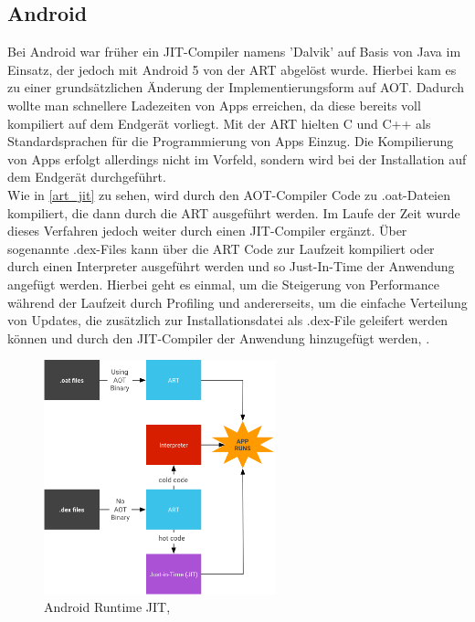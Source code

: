 \subsection{Android}
Bei Android war früher ein \ac{JIT}-Compiler namens 'Dalvik' auf Basis von Java im Einsatz, der jedoch mit Android 5 von der \ac{ART} abgelöst wurde. Hierbei kam es zu einer grundsätzlichen Änderung der Implementierungsform auf \ac{AOT}. Dadurch wollte man schnellere Ladezeiten von Apps erreichen, da diese bereits voll kompiliert auf dem Endgerät vorliegt. Mit der \ac{ART} hielten C und C++ als Standardsprachen für die Programmierung von Apps Einzug. Die Kompilierung von Apps erfolgt allerdings nicht im Vorfeld, sondern wird bei der Installation auf dem Endgerät durchgeführt.\\
Wie in \autoref{art_jit} zu sehen, wird durch den \ac{AOT}-Compiler Code zu .oat-Dateien kompiliert, die dann durch die \ac{ART} ausgeführt werden. Im Laufe der Zeit wurde dieses Verfahren jedoch weiter durch einen \ac{JIT}-Compiler ergänzt. Über sogenannte .dex-Files kann über die \ac{ART} Code zur Laufzeit kompiliert oder durch einen Interpreter ausgeführt werden und so Just-In-Time der Anwendung angefügt werden. Hierbei geht es einmal, um die Steigerung von Performance während der Laufzeit durch Profiling und andererseits, um die einfache Verteilung von Updates, die zusätzlich zur Installationsdatei als .dex-File geleifert werden können und durch den \ac{JIT}-Compiler der Anwendung hinzugefügt werden, \cite[vgl. Android 2022, Webseite abgerufen am 03.12.2022]{android_runtime}.
\begin{figure}[ht]
    \begin{center}
        \includegraphics[width=0.6\textwidth]{assets/img/jit-arch.png}
        \caption{Android Runtime JIT, \cite[Quelle: Android 2022, Webseite abgerufen am 03.12.2022]{android_runtime}}
        \label{art_jit}
    \end{center}
\end{figure}

